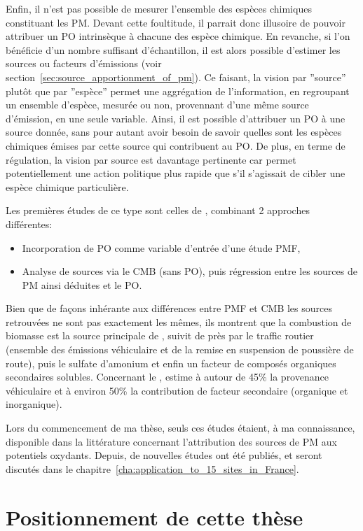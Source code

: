 Enfin, il n'est pas possible de mesurer l'ensemble des espèces chimiques constituant les
PM. Devant cette foultitude, il parrait donc illusoire de pouvoir attribuer un PO
intrinsèque à chacune des espèce chimique.
En revanche, si l'on bénéficie d'un nombre suffisant d'échantillon, il est alors possible
d'estimer les sources ou facteurs d'émissions (voir
section~\ref{sec:source_apportionment_of_pm}). Ce faisant, la vision par ''source'' plutôt
que par ''espèce'' permet une aggrégation de l'information, en regroupant un ensemble
d'espèce, mesurée ou non, provennant d'une même source d'émission, en une seule variable.
Ainsi, il est possible d'attribuer un PO à une source donnée, sans pour autant avoir
besoin de savoir quelles sont les espèces chimiques émises par cette source qui
contribuent au PO.
De plus, en terme de régulation, la vision par source est davantage pertinente car permet
potentiellement une action politique plus rapide que s'il s'agissait de cibler une espèce
chimique particulière.

Les premières études de ce type sont celles de
\textcite{vermaReactive2014,batesReactive2015,fangOxidative2016}, combinant 2 approches
différentes:
\begin{itemize}
    \item Incorporation de PO comme variable d'entrée d'une étude PMF,
    \item Analyse de sources via le CMB (sans PO), puis régression entre les sources de PM
        ainsi déduites et le PO.
\end{itemize}
Bien que de façons inhérante aux différences entre PMF et CMB les sources retrouvées ne
sont pas exactement les mêmes, ils montrent que la combustion de biomasse est la source
principale de \PODTTv, suivit de près par le traffic routier (ensemble des émissions
véhiculaire et de la remise en suspension de poussière de route), puis le sulfate
d'amonium et enfin un facteur de composés organiques secondaires solubles.
Concernant le \POAAv, \textcite{fangOxidative2016} estime à autour de 45\% la provenance
véhiculaire et à environ 50\% la contribution de facteur secondaire (organique et
inorganique).

Lors du commencement de ma thèse, seuls ces études étaient, à ma connaissance, disponible
dans la littérature concernant l'attribution des sources de PM aux potentiels oxydants.
Depuis, de nouvelles études ont été publiés, et seront discutés dans le
chapitre~\ref{cha:application_to_15_sites_in_France}.


\section{Positionnement de cette thèse}%
\label{sec:positionnement_de_cette_thèse}

\printbibliography[segment=2,heading=subbibliography]


